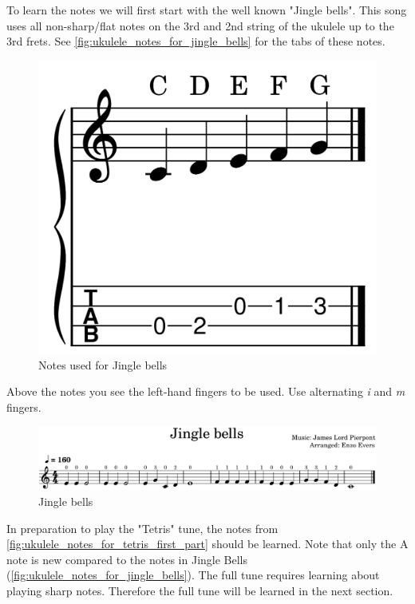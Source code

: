 To learn the notes we will first start with the well known "Jingle bells". This song uses all non-sharp/flat notes on the 3rd and 2nd string of the ukulele up to the 3rd frets. See \autoref{fig:ukulele_notes_for_jingle_bells} for the tabs of these notes.

\begin{figure}[h]
	\centering
	\includegraphics[height=0.12\textheight]{../../MuseScore/Ukulele/UkuleleNotesInJingleBells.png}
	\caption{Notes used for Jingle bells}
	\label{fig:ukulele_notes_for_jingle_bells}
\end{figure}

Above the notes you see the left-hand fingers to be used. Use alternating \textit{i} and \textit{m} fingers.

\begin{figure}[h]
	\centering
	\includegraphics[width=\textwidth]{../../MuseScore/Ukulele/UkuleleJingleBells.png}
	\caption{Jingle bells}
	\label{fig:ukulele_jingle_bells}
\end{figure}

\newpage

In preparation to play the "Tetris" tune, the notes from \autoref{fig:ukulele_notes_for_tetris_first_part} should be learned. Note that only the A note is new compared to the notes in Jingle Bells (\autoref{fig:ukulele_notes_for_jingle_bells}). The full tune requires learning about playing sharp notes. Therefore the full tune will be learned in the next section.

